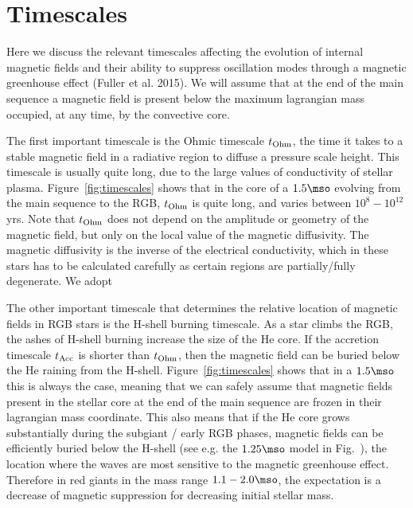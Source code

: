 \section{Timescales}
\label{time}
Here we discuss the relevant timescales affecting the evolution of internal magnetic fields and their ability to 
suppress oscillation modes through a magnetic greenhouse effect (Fuller et al. 2015).
We will assume that at the end of the main sequence a magnetic field is present below the maximum lagrangian mass occupied, at any time, by the convective core.

The first important timescale is the Ohmic timescale $t_{\rm Ohm}$, the time it takes to a stable magnetic field in a radiative region to diffuse a pressure scale height. This timescale is usually quite long, due to the large values of conductivity of stellar plasma. Figure~\ref{fig:timescales} shows that in the core of a $1.5\mso$ evolving from the main sequence to the RGB,  $t_{\rm Ohm}$ is quite long, and varies between $10^8-10^{12}$ yrs. Note that  $t_{\rm Ohm}$ does not depend on the amplitude or geometry of the magnetic field, but only on the local value of the magnetic diffusivity. The magnetic diffusivity is the inverse of the electrical conductivity,  which in these stars has to be calculated carefully as certain regions are partially/fully degenerate. We adopt

The other important timescale that determines the relative location of magnetic fields in  RGB stars is the H-shell burning timescale. As a star climbs the RGB, the ashes of H-shell burning increase the size of the He core. If the accretion timescale $t_{\rm Acc}$  is shorter than  $t_{\rm Ohm}$, then the magnetic field can be buried below the He raining from the H-shell. Figure~\ref{fig:timescales} shows that in a $1.5\mso$ this is always the case, meaning that 
we can safely assume that magnetic fields present in the stellar core at the end of the main sequence are frozen in their lagrangian mass coordinate. This also means that if the He core grows substantially during the subgiant / early RGB phases, magnetic fields can be efficiently buried below the H-shell (see e.g. the $1.25\mso$ model in Fig.~\label{fig:DipoleHist}), the location where the waves are most sensitive to the magnetic greenhouse effect. Therefore in red giants in the mass range $1.1-2.0\mso$, the expectation is a decrease of magnetic suppression for decreasing initial stellar mass.

